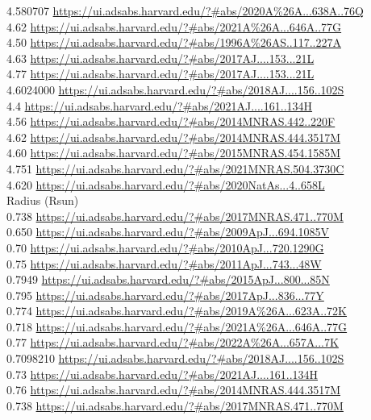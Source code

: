 4.580707 \url{https://ui.adsabs.harvard.edu/?#abs/2020A%26A...638A..76Q}\\
4.62 \url{https://ui.adsabs.harvard.edu/?#abs/2021A%26A...646A..77G}\\
4.50 \url{https://ui.adsabs.harvard.edu/?#abs/1996A%26AS..117..227A}\\
4.63 \url{https://ui.adsabs.harvard.edu/?#abs/2017AJ....153...21L}\\
4.77 \url{https://ui.adsabs.harvard.edu/?#abs/2017AJ....153...21L}\\
4.6024000 \url{https://ui.adsabs.harvard.edu/?#abs/2018AJ....156..102S}\\
4.4 \url{https://ui.adsabs.harvard.edu/?#abs/2021AJ....161..134H}\\
4.56 \url{https://ui.adsabs.harvard.edu/?#abs/2014MNRAS.442..220F}\\
4.62 \url{https://ui.adsabs.harvard.edu/?#abs/2014MNRAS.444.3517M}\\
4.60 \url{https://ui.adsabs.harvard.edu/?#abs/2015MNRAS.454.1585M}\\
4.751 \url{https://ui.adsabs.harvard.edu/?#abs/2021MNRAS.504.3730C}\\
4.620 \url{https://ui.adsabs.harvard.edu/?#abs/2020NatAs...4..658L}\\
Radius (Rsun)\\
0.738 \url{https://ui.adsabs.harvard.edu/?#abs/2017MNRAS.471..770M}\\
0.650 \url{https://ui.adsabs.harvard.edu/?#abs/2009ApJ...694.1085V}\\
0.70 \url{https://ui.adsabs.harvard.edu/?#abs/2010ApJ...720.1290G}\\
0.75 \url{https://ui.adsabs.harvard.edu/?#abs/2011ApJ...743...48W}\\
0.7949 \url{https://ui.adsabs.harvard.edu/?#abs/2015ApJ...800...85N}\\
0.795 \url{https://ui.adsabs.harvard.edu/?#abs/2017ApJ...836...77Y}\\
0.774 \url{https://ui.adsabs.harvard.edu/?#abs/2019A%26A...623A..72K}\\
0.718 \url{https://ui.adsabs.harvard.edu/?#abs/2021A%26A...646A..77G}\\
0.77 \url{https://ui.adsabs.harvard.edu/?#abs/2022A%26A...657A...7K}\\
0.7098210 \url{https://ui.adsabs.harvard.edu/?#abs/2018AJ....156..102S}\\
0.73 \url{https://ui.adsabs.harvard.edu/?#abs/2021AJ....161..134H}\\
0.76 \url{https://ui.adsabs.harvard.edu/?#abs/2014MNRAS.444.3517M}\\
0.738 \url{https://ui.adsabs.harvard.edu/?#abs/2017MNRAS.471..770M}\\

